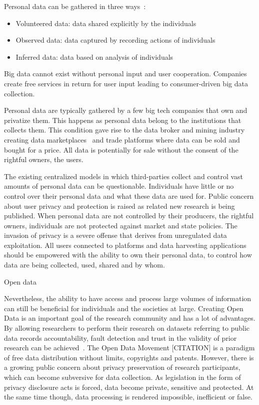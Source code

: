 Personal data can be gathered in three ways~\cite{emergence_new_assets_wef}:

\begin{itemize}
  \item Volunteered data: data shared explicitly by the individuals
  \item Observed data: data captured by recording actions of individuals
  \item Inferred data: data based on analysis of individuals
\end{itemize}

Big data cannot exist without personal input and user cooperation. Companies create free services in return for user input leading to consumer-driven big data collection.

Personal data are typically gathered by a few big tech companies that own and privatize them. This happens as personal data belong to the institutions that collects them.  This condition gave rise to the data broker and mining industry creating data marketplaces~\cite{dawex, q_dx, datastreamx} and trade platforms where data can be sold and bought for a price. All data is potentially for sale without the consent of the rightful owners, the users.

The existing centralized models in which third-parties collect and control vast amounts of personal data can be questionable. Individuals have little or no control over their personal data and what these data are used for. Public concern about user privacy and protection is raised as related new research is being published. When personal data are not controlled by their producers, the rightful owners, individuals are not protected against market and state policies. The invasion of privacy is a severe offense that derives from unregulated data exploitation. All users connected to platforms and data harvesting applications should be empowered with the ability to own their personal data, to control how data are being collected, used, shared and by whom.

Open data

Nevertheless, the ability to have access and process large volumes of information can still be beneficial for individuals and the societies at large. Creating Open Data is an important goal of the research community and has a lot of advantages. By allowing researchers to perform their research on datasets referring to public data records accountability, fault detection and trust in the validity of prior research can be achieved~\cite{open_data_1}. The Open Data Movement [CITATION] is a paradigm of free data distribution without limits, copyrights and patents. However, there is a growing public concern about privacy preservation of research participants, which can become subversive for data collection. As legislation in the form of privacy disclosure acts is forced, data become private, sensitive and protected. At the same time though, data processing is rendered impossible, inefficient or false.

